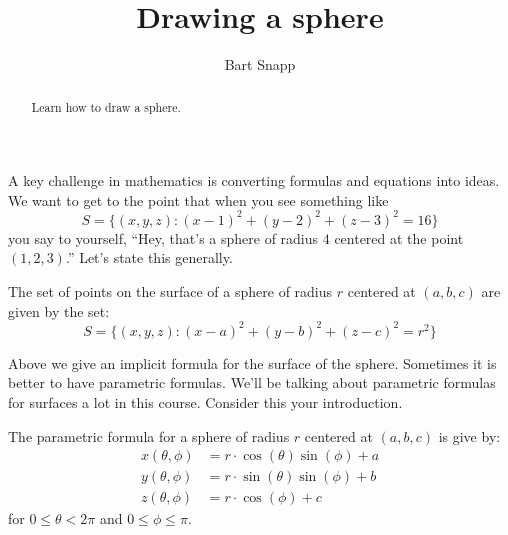 \documentclass{ximera}
\author{Bart Snapp}
\title[Dig-In:]{Drawing a sphere}
\begin{document}
\begin{abstract}
  Learn how to draw a sphere.
\end{abstract}
\maketitle

A key challenge in mathematics is converting formulas and equations
into ideas. We want to get to the point that when you see something
like
\[
S = \{(x,y,z):(x-1)^2+(y-2)^2+(z-3)^2=16\}
\]
you say to yourself, ``Hey, that's a sphere of radius $4$ centered at
the point $(1,2,3)$.'' Let's state this generally.
\begin{theorem}
  The set of points on the surface of a sphere of radius $r$ centered
  at $(a,b,c)$ are given by the set:
  \[
  S = \{(x,y,z):(x-a)^2+(y-b)^2+(z-c)^2=r^2\}
  \]
\end{theorem}
Above we give an implicit formula for the surface of the
sphere. Sometimes it is better to have parametric formulas. We'll be
talking about parametric formulas for surfaces a lot in this
course. Consider this your introduction.
\begin{theorem}
  The parametric formula for a sphere of radius $r$ centered at
  $(a,b,c)$ is give by:
  \begin{align*}
    x(\theta,\phi) &=r\cdot\cos(\theta)\sin(\phi)+a\\
    y(\theta,\phi) &=r\cdot\sin(\theta)\sin(\phi)+b\\
    z(\theta,\phi) &=r\cdot\cos(\phi)+c
  \end{align*}
  for $0\le\theta< 2\pi$ and $0\le \phi\le \pi$.
\end{theorem}
\end{document}
